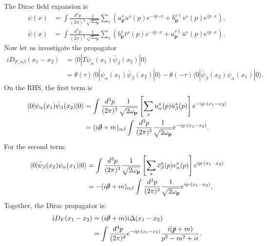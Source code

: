 The Dirac field expansion is
\begin{equation}
\begin{aligned}
	\psi(x) &=\int \frac{d^{3} p}{(2 \pi)^{3}} \frac{1}{\sqrt{2 \omega_{\mathbf{p}}}} 
		\sum_{s}\left(a_{\mathbf{p}}^{s} u^{s}(p) e^{-i p \cdot x}
		+b_{\mathbf{p}}^{s \dagger} v^{s}(p) e^{i p \cdot x}\right), \\
	\bar{\psi}(x) &=\int \frac{d^{3} p}{(2 \pi)^{3}} \frac{1}{\sqrt{2 \omega_{\mathbf{p}}}} 
		\sum_{s}\left(b_{\mathbf{p}}^{s} \bar{v}^{s}(p) e^{-i p \cdot x}
		+a_{\mathbf{p}}^{s \dagger} \bar{u}^{s}(p) e^{i p \cdot x}\right).
\end{aligned}
\end{equation}
Now let us investigate the propagator
\begin{equation}
\begin{aligned}
	iD_{F,\alpha\beta}(x_1-x_2) &= \langle0|T\psi_\alpha(x_1)\bar\psi_\beta(x_2)|0\rangle \\
	&= \theta(\tau) \langle0|\psi_\alpha(x_1)\bar\psi_\beta(x_2)|0\rangle - \theta(-\tau) \langle0|\bar\psi_\beta(x_2)\psi_\alpha(x_1)|0\rangle.
\end{aligned}
\end{equation}
On the RHS, the first term is
\begin{equation*}
\begin{aligned}
	\langle0|\psi_\alpha(x_1)\bar\psi_\beta(x_2)|0\rangle 
	&= \int \frac{d^{3} p}{(2 \pi)^{3}} \frac{1}{\sqrt{2 \omega_{\mathbf{p}}}} \left[\sum_s u_\alpha^s(p)\bar u_\beta^s(p)\right]e^{-i p\cdot (x_1-x_2)} \\
	&= (i\cancel \partial+m)_{\alpha\beta}\int \frac{d^{3} p}{(2 \pi)^{3}} \frac{1}{\sqrt{2 \omega_{\mathbf{p}}}} e^{-i p\cdot (x_1-x_2)}.
\end{aligned}
\end{equation*}
For the second term:
\begin{equation*}
\begin{aligned}
	\langle0|\bar\psi_\beta(x_2)\psi_\alpha(x_1)|0\rangle
	&= \int \frac{d^{3} p}{(2 \pi)^{3}} \frac{1}{\sqrt{2 \omega_{\mathbf{p}}}} \left[\sum_s \bar v_\beta^s(p)v_\alpha^s(p)\right]e^{i p\cdot (x_1-x_2)} \\
	&= -(i\cancel \partial + m)_{\alpha\beta}\int \frac{d^{3} p}{(2 \pi)^{3}} \frac{1}{\sqrt{2 \omega_{\mathbf{p}}}} e^{i p\cdot (x_1-x_2)}.
\end{aligned}
\end{equation*}
Together, the Dirac propagator is:
\begin{equation*}
\begin{aligned}
	iD_F(x_1-x_2) &= (i\cancel \partial+m)i\Delta(x_1-x_2) \\
	&= \int\frac{d^{4} p}{(2\pi)^{4}} e^{-i p\cdot (x_1-x_2)}\frac{i(\cancel p+m)}{p^2-m^2+i\epsilon}.
\end{aligned}
\end{equation*}


